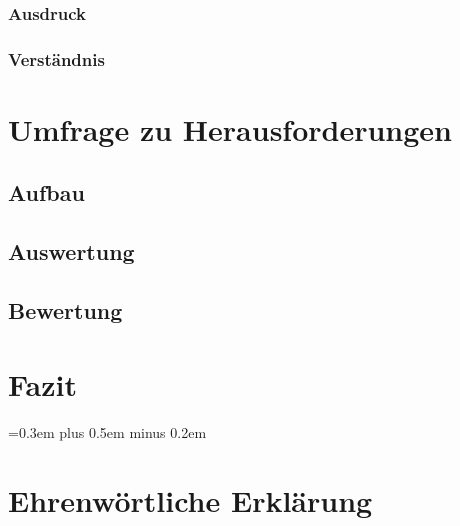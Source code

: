 \documentclass[
	12pt, %
	a4paper,
	bibliography=totoc, %
	numbers=noenddot, %
	ngerman, %
	headsepline, %
	oneside %
	]{scrbook} %
\begin{document}
\subsection{Ausdruck}\label{subsec:umgebung}


\subsection{Verständnis}\label{subsec:verstaendins}


% 
\chapter{Umfrage zu Herausforderungen}\label{ch:umfrage}


\section{Aufbau}\label{sec:aufbau}


\section{Auswertung}\label{sec:auswertung}


\section{Bewertung}\label{sec:bewertung}



\chapter{Fazit}\label{ch:fazit}


\spaceskip=0.3em plus 0.5em minus 0.2em
\printbibliography{}


\chapter*{Ehrenwörtliche Erklärung}

\end{document}
